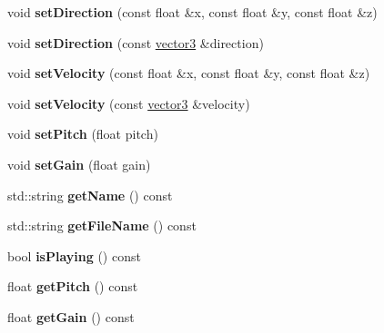 \begin{DoxyCompactItemize}
void {\bfseries set\+Direction} (const float \&x, const float \&y, const float \&z)
\item 
\mbox{\label{classflounder_1_1sound_acf5ff23cc10029471f4429f0980fd952}} 
void {\bfseries set\+Direction} (const \hyperlink{classflounder_1_1vector3}{vector3} \&direction)
\item 
\mbox{\label{classflounder_1_1sound_adf7b60daeda5002e513da84bcf4845ee}} 
void {\bfseries set\+Velocity} (const float \&x, const float \&y, const float \&z)
\item 
\mbox{\label{classflounder_1_1sound_aaa2cca4f984b51aa13c06574d470337d}} 
void {\bfseries set\+Velocity} (const \hyperlink{classflounder_1_1vector3}{vector3} \&velocity)
\item 
\mbox{\label{classflounder_1_1sound_aaa376f07856d3438952811e95d9e4d8b}} 
void {\bfseries set\+Pitch} (float pitch)
\item 
\mbox{\label{classflounder_1_1sound_a95fe31e3dddad4a9dd184689dbf85c5c}} 
void {\bfseries set\+Gain} (float gain)
\item 
\mbox{\label{classflounder_1_1sound_a3681af7bd10ea80824a4d3795392ded3}} 
std\+::string {\bfseries get\+Name} () const
\item 
\mbox{\label{classflounder_1_1sound_ab243e26b443db6fe6a115fce0a4781f1}} 
std\+::string {\bfseries get\+File\+Name} () const
\item 
\mbox{\label{classflounder_1_1sound_a30f084f302f59ff6a1d6990af35b3621}} 
bool {\bfseries is\+Playing} () const
\item 
\mbox{\label{classflounder_1_1sound_a95258576a1edca294ea847a19de57ef7}} 
float {\bfseries get\+Pitch} () const
\item 
\mbox{\label{classflounder_1_1sound_ad4aaa2c18025d3e642310d86fb9361fd}} 
float {\bfseries get\+Gain} () const
\end{DoxyCompactItemize}
